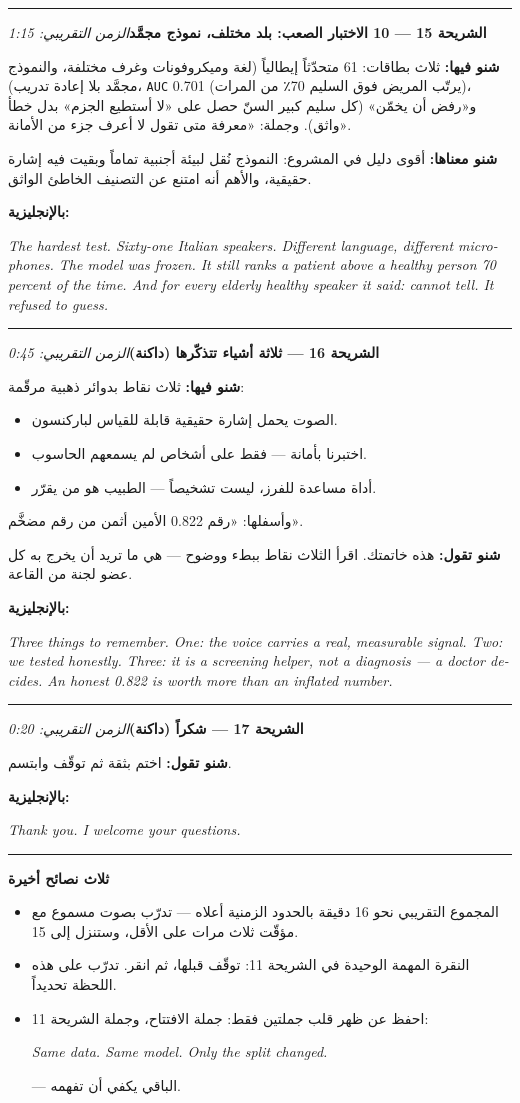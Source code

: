 \documentclass[12pt,a4paper]{article}
\newcommand{\E}[1]{\textenglish{\texttt{#1}}}
\newcommand{\N}[1]{\textenglish{#1}}
\newcommand{\slayd}[3]{%
  \par\vspace{10pt}\hrule\vspace{8pt}%
  {\large\textbf{الشريحة #1 — #2}}\hfill{\small\textit{الزمن التقريبي: #3}}\par\vspace{4pt}%
}
\newcommand{\fiha}{\textbf{شنو فيها: }}
\newcommand{\managementhaha}{\textbf{شنو معناها: }}
\newcommand{\tqul}{\textbf{شنو تقول: }}
\newcommand{\bilinglizi}[1]{\par\textbf{بالإنجليزية:}\par
  \begin{english}\small\itshape #1\end{english}\par}
\begin{document}
\slayd{\N{15}}{\N{10} الاختبار الصعب: بلد مختلف، نموذج مجمَّد}{\N{1:15}}
\fiha ثلاث بطاقات: \N{61} متحدّثاً إيطالياً (لغة وميكروفونات وغرف
مختلفة، والنموذج مجمَّد بلا إعادة تدريب)، \E{AUC} \N{0.701} (يرتّب
المريض فوق السليم \N{70}٪ من المرات)، و«رفض أن يخمّن» (كل سليم كبير
السنّ حصل على «لا أستطيع الجزم» بدل خطأ واثق). وجملة: «معرفة متى تقول
لا أعرف جزء من الأمانة».
\par\managementhaha أقوى دليل في المشروع: النموذج نُقل لبيئة أجنبية
تماماً وبقيت فيه إشارة حقيقية، والأهم أنه امتنع عن التصنيف الخاطئ
الواثق.
\bilinglizi{The hardest test. Sixty-one Italian speakers. Different
language, different microphones. The model was frozen. It still ranks a
patient above a healthy person 70 percent of the time. And for every
elderly healthy speaker it said: cannot tell. It refused to guess.}

\slayd{\N{16}}{ثلاثة أشياء تتذكّرها (داكنة)}{\N{0:45}}
\fiha ثلاث نقاط بدوائر ذهبية مرقّمة:
\begin{itemize}
  \item الصوت يحمل إشارة حقيقية قابلة للقياس لباركنسون.
  \item اختبرنا بأمانة — فقط على أشخاص لم يسمعهم الحاسوب.
  \item أداة مساعدة للفرز، ليست تشخيصاً — الطبيب هو من يقرّر.
\end{itemize}
وأسفلها: «رقم \N{0.822} الأمين أثمن من رقم مضخَّم».
\par\tqul هذه خاتمتك. اقرأ الثلاث نقاط ببطء ووضوح — هي ما تريد أن يخرج
به كل عضو لجنة من القاعة.
\bilinglizi{Three things to remember. One: the voice carries a real,
measurable signal. Two: we tested honestly. Three: it is a screening
helper, not a diagnosis --- a doctor decides. An honest 0.822 is worth
more than an inflated number.}

\slayd{\N{17}}{شكراً (داكنة)}{\N{0:20}}
\tqul اختم بثقة ثم توقّف وابتسم.
\bilinglizi{Thank you. I welcome your questions.}

\par\vspace{12pt}\hrule\vspace{10pt}
{\large\textbf{ثلاث نصائح أخيرة}}\par
\begin{itemize}
  \item المجموع التقريبي نحو \N{16} دقيقة بالحدود الزمنية أعلاه — تدرّب
        بصوت مسموع مع مؤقّت ثلاث مرات على الأقل، وستنزل إلى \N{15}.
  \item النقرة المهمة الوحيدة في الشريحة \N{11}: توقّف قبلها، ثم انقر.
        تدرّب على هذه اللحظة تحديداً.
  \item احفظ عن ظهر قلب جملتين فقط: جملة الافتتاح، وجملة الشريحة
        \N{11}: \begin{english}\itshape Same data. Same model. Only the
        split changed.\end{english} — الباقي يكفي أن تفهمه.
\end{itemize}
\end{document}
